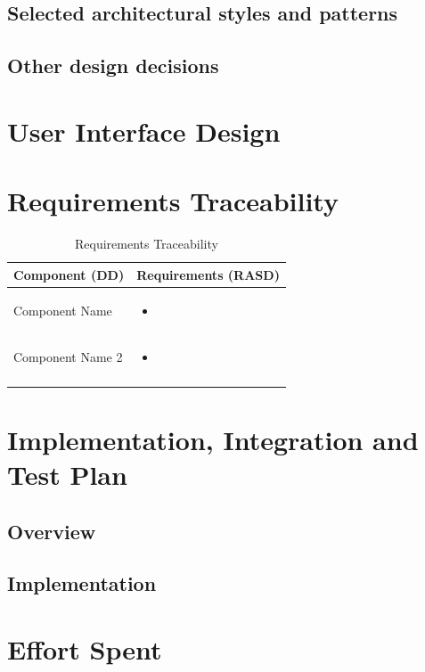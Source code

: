 \documentclass{article}
\begin{document}
	
	\subsection{Selected architectural styles and patterns}
	
	
	\subsection{Other design decisions}
	

\section{User Interface Design}

\section{Requirements Traceability}
	
	\begin{longtable}{| p{5 cm} | p{8 cm} |} \hline
		Component (DD) & Requirements (RASD)  \\ \hline
		\newline Component Name & 
		\begin{itemize}
			\item 
		\end{itemize}	\\ \hline
		\newline Component Name 2 & 
		\begin{itemize}
			\item  
		\end{itemize}		\\	 \hline				
		\caption{Requirements Traceability}	
		
	\end{longtable}
	
	
\section{Implementation, Integration and Test Plan}
	\subsection{Overview}
		
	\subsection{Implementation}
	
		
\section{Effort Spent}
	
	
\end{document}
